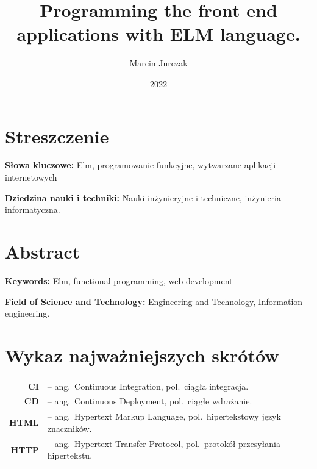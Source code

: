 \documentclass[twoside,a4paper]{report}
\begin{document}


\title{Programming the front end applications with ELM language.}
\author{Marcin Jurczak}
\date{2022}

\maketitle


\chapter*{Streszczenie}
\noindent
\lipsum[1]

\textbf{Słowa kluczowe:} Elm, programowanie funkcyjne, wytwarzane aplikacji internetowych

\textbf{Dziedzina nauki i techniki: }Nauki inżynieryjne i techniczne, inżynieria informatyczna.

{\let\clearpage\relax\chapter*{Abstract}}
\noindent
\lipsum[1]

\textbf{Keywords:} Elm, functional programming, web development

\textbf{Field of Science and Technology:} Engineering and Technology, Information engineering.

\tableofcontents

\chapter*{Wykaz najważniejszych skrótów}
\begin{tabular}{rl}
    \textbf{CI} & -- ang.~Continuous Integration, pol.~ciągła integracja.\\
    \textbf{CD} & -- ang.~Continuous Deployment, pol.~ciągłe wdrażanie.\\
    \textbf{HTML} & -- ang.~Hypertext Markup Language, pol.~hipertekstowy język znaczników.\\
    \textbf{HTTP} & -- ang.~Hypertext Transfer Protocol, pol.~protokół przesyłania hipertekstu.\\
\end{tabular}
\end{document}
